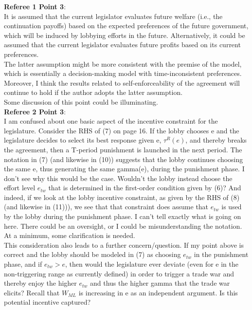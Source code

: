 \documentclass[12pt]{article}
\begin{document}
\textbf{Referee 1 Point 3}: \\
It is assumed that the current legislator evaluates future welfare (i.e., the continuation payoffs) based on the expected preferences of the future government, which will be induced by lobbying efforts in the future. Alternatively, it could be assumed that the current legislator evaluates future profits based on its current preferences. \\

The latter assumption might be more consistent with the premise of the model, which is essentially a decision-making model with time-inconsistent preferences. Moreover, I think the results related to self-enforceability of the agreement will continue to hold if the author adopts the latter assumption. \\

Some discussion of this point could be illuminating. \\

\textbf{Referee 2 Point 3}: \\
 I am confused about one basic aspect of the incentive constraint for the legislature. Consider the RHS of (7) on page 16. If the lobby chooses e and the legislature decides to select its best response given e, $\tau^R(e)$, and thereby breaks the agreement, then a T-period punishment is launched in the next period. The notation in (7) (and likewise in (10)) suggests that the lobby continues choosing the same e, thus generating the same gamma(e), during the punishment phase. I don't see why this would be the case. Wouldn't the lobby instead choose the effort level $e_{tw}$ that is determined in the first-order condition given by (6)? And indeed, if we look at the lobby incentive constraint, as given by the RHS of (8) (and likewise in (11))), we see that that constraint does assume that $e_{tw}$ is used by the lobby during the punishment phase. I can't tell exactly what is going on here. There could be an oversight, or I could be misunderstanding the notation. At a minimum, some clarification is needed. \\

This consideration also leads to a further concern/question. If my point above is correct and the lobby should be modeled in (7) as choosing $e_{tw}$ in the punishment phase, and if $e_{tw} > e$, then would the legislature ever deviate (even for e in the non-triggering range as currently defined) in order to trigger a trade war and thereby enjoy the higher $e_{tw}$ and thus the higher gamma that the trade war elicits? Recall that $W_{ML}$ is increasing in e as an independent argument. Is this potential incentive captured? \\
\end{document}

